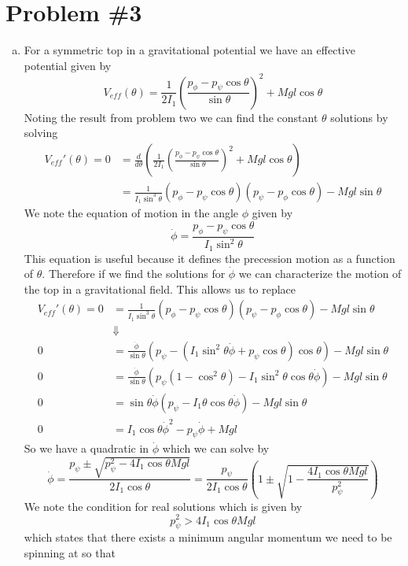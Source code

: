 \documentclass[11pt]{article}
\numberwithin{equation}{section}
\begin{document}
\pagebreak

\section{Problem \#3}
\begin{enumerate}[(a)]
\item For a symmetric top in a gravitational potential we have an effective potential given
by
$$V_{eff}(\theta) = \frac{1}{2I_1}\left(\frac{p_{\phi}-p_{\psi}\cos\theta}{\sin\theta}\right)^2 + Mgl\cos\theta$$
Noting the result from problem two we can find the constant $\theta$ solutions by solving
\begin{align*}
V_{eff}'(\theta) = 0 &= \frac{d}{d\theta}\left(\frac{1}{2I_1}\left(\frac{p_{\phi}-p_{\psi}\cos\theta}{\sin\theta}\right)^2 + Mgl\cos\theta\right)\\
&= \frac{1}{I_1\sin^3\theta}\left(p_{\phi}-p_{\psi}\cos\theta\right)(p_{\psi}-p_{\phi}\cos\theta) - Mgl\sin\theta
\end{align*}
We note the equation of motion in the angle $\phi$ given by 
$$\dot{\phi} = \frac{p_{\phi}-p_{\psi}\cos\theta}{I_1\sin^2\theta}$$
This equation is useful because it defines the precession motion as a function of $\theta$. 
Therefore if we find the solutions for $\dot{\phi}$ we can characterize the motion of the top
in a gravitational field. This allows us to replace 
\begin{align*}
V_{eff}'(\theta) = 0 &= \frac{1}{I_1\sin^3\theta}\left(p_{\phi}-p_{\psi}\cos\theta\right)(p_{\psi}-p_{\phi}\cos\theta) - Mgl\sin\theta\\
&\Downarrow\\
0 &= \frac{\dot{\phi}}{\sin\theta}(p_{\psi}-(I_1\sin^2\theta\dot{\phi} + p_{\psi}\cos\theta)\cos\theta) - Mgl\sin\theta\\
0 &= \frac{\dot{\phi}}{\sin\theta}(p_{\psi}(1-\cos^2\theta)-I_1\sin^2\theta\cos\theta\dot{\phi}) - Mgl\sin\theta\\
0 &= \sin\theta\dot{\phi}(p_{\psi}-I_1\theta\cos\theta\dot{\phi}) - Mgl\sin\theta\\
0 &= I_1\cos\theta\dot{\phi}^2 - p_{\psi}\dot{\phi} + Mgl
\end{align*}
So we have a quadratic in $\dot{\phi}$ which we can solve by
$$\dot{\phi} = \frac{p_{\psi}\pm\sqrt{p_{\psi}^2-4I_1\cos\theta{Mgl}}}{2I_1\cos\theta} = \frac{p_{\psi}}{2I_1\cos\theta}\left(1\pm\sqrt{1-\frac{4I_1\cos\theta{Mgl}}{p_{\psi}^2}}\right)$$
We note the condition for real solutions which is given by
$$p_{\psi}^2>4I_1\cos\theta{Mgl}$$
which states that there exists a minimum angular momentum we need to be spinning at so that 

\end{enumerate}
\end{document}
